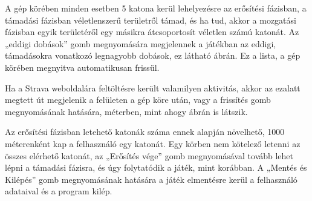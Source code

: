 

A gép körében minden esetben 5 katona kerül lehelyezésre az erősítési fázisban, a támadási fázisban véletlenszerű területről támad, és ha tud, akkor a mozgatási fázisban egyik területéről egy másikra átcsoportosít véletlen számú katonát.
Az „eddigi dobások” gomb megnyomására megjelennek a játékban az eddigi, támadásokra vonatkozó legnagyobb dobások, ez látható  ábrán.
Ez a lista, a gép körében megnyitva automatikusan frissül. 



Ha a Strava weboldalára feltöltésre került valamilyen aktivitás, akkor az ezalatt megtett út megjelenik a felületen a gép köre után, vagy a frissítés gomb megnyomásának hatására, méterben, mint ahogy  ábrán is látszik. 



Az erősítési fázisban letehető katonák száma ennek alapján növelhető, 1000 méterenként kap a felhasználó egy katonát.
Egy körben nem kötelező letenni az összes elérhető katonát, az „Erősítés vége” gomb megnyomásával tovább lehet lépni a támadási fázisra, és úgy folytatódik a játék, mint korábban. A „Mentés és Kilépés” gomb megnyomásának hatására a játék elmentésre kerül a felhasználó adataival és a program kilép.